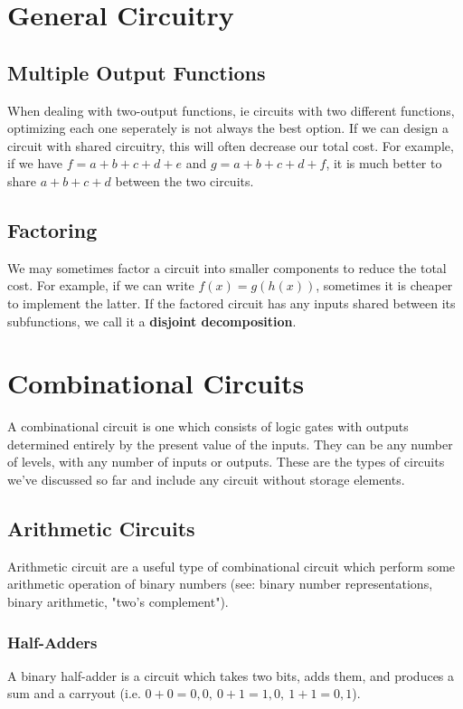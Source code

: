 \documentclass[12pt]{article}
\begin{document}
\section*{General Circuitry}
\subsection*{Multiple Output Functions}
When dealing with two-output functions, ie circuits with two different functions, optimizing each one seperately is not always the best option. If we can design a circuit with shared circuitry, this will often decrease our total cost. For example, if we have $f = a + b + c + d + e$ and $g = a + b + c + d + f$, it is much better to share $a + b + c + d$ between the two circuits.

\subsection*{Factoring}
We may sometimes factor a circuit into smaller components to reduce the total cost. For example, if we can write $f(x) = g(h(x))$, sometimes it is cheaper to implement the latter. If the factored circuit has any inputs shared between its subfunctions, we call it a {\bf disjoint decomposition}.

\section*{Combinational Circuits}
A combinational circuit is one which consists of logic gates with outputs determined entirely by the present value of the inputs. They can be any number of levels, with any number of inputs or outputs. These are the types of circuits we've discussed so far and include any circuit without storage elements.

\subsection*{Arithmetic Circuits}
Arithmetic circuit are a useful type of combinational circuit which perform some arithmetic operation of binary numbers (see: binary number representations, binary arithmetic, "two's complement").

\subsubsection*{Half-Adders}
A binary half-adder is a circuit which takes two bits, adds them, and produces a sum and a carryout (i.e. $0 + 0 = 0,0,\ 0 + 1 = 1,0,\ 1 + 1 = 0,1$).
\end{document}
